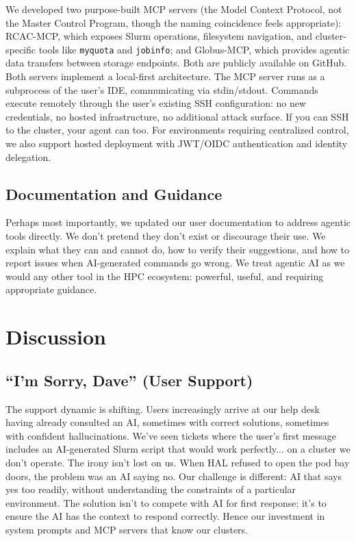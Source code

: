 \documentclass[sigconf]{acmart}
\begin{document}
We developed two purpose-built MCP servers (the Model Context Protocol, not the Master
Control Program, though the naming coincidence feels appropriate): RCAC-MCP, which
exposes Slurm operations, filesystem navigation, and cluster-specific tools like
\texttt{myquota} and \texttt{jobinfo}; and Globus-MCP, which provides agentic data
transfers between storage endpoints. Both are publicly available on GitHub.
Both servers implement a local-first architecture. The MCP server runs as
a subprocess of the user's IDE, communicating via stdin/stdout. Commands execute remotely
through the user's existing SSH configuration: no new credentials, no hosted infrastructure,
no additional attack surface. If you can SSH to the cluster, your agent can too. For
environments requiring centralized control, we also support hosted deployment with
JWT/OIDC authentication and identity delegation.

\subsection{Documentation and Guidance}

Perhaps most importantly, we updated our user documentation to address agentic tools
directly. We don't pretend they don't exist or discourage their use. We explain what
they can and cannot do, how to verify their suggestions, and how to report issues when
AI-generated commands go wrong. We treat agentic AI as we would any other tool in the
HPC ecosystem: powerful, useful, and requiring appropriate guidance.

\section{Discussion}

\subsection{``I'm Sorry, Dave'' (User Support)}

The support dynamic is shifting. Users increasingly arrive at our help desk having already
consulted an AI, sometimes with correct solutions, sometimes with confident hallucinations.
We've seen tickets where the user's first message includes an AI-generated Slurm script
that would work perfectly... on a cluster we don't operate.
The irony isn't lost on us. When HAL refused to open the pod bay doors, the problem was
an AI saying no. Our challenge is different: AI that says yes too readily, without
understanding the constraints of a particular environment. The solution isn't to compete
with AI for first response; it's to ensure the AI has the context to respond correctly.
Hence our investment in system prompts and MCP servers that know our clusters.
\end{document}
